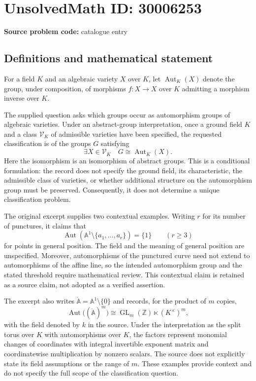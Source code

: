 \documentclass[11pt]{article}
\newcommand{\Z}{\mathbb{Z}}
\begin{document}
\section*{UnsolvedMath ID: 30006253}
\textbf{Source problem code:} catalogue entry
\subsection{Definitions and mathematical statement}
For a field \(K\) and an algebraic variety \(X\) over \(K\), let \(\operatorname{Aut}_K(X)\) denote the group, under composition, of morphisms \(f:X\to X\) over \(K\) admitting a morphism inverse over \(K\).

The supplied question asks which groups occur as automorphism groups of algebraic varieties. Under an abstract-group interpretation, once a ground field \(K\) and a class \(\mathcal V_K\) of admissible varieties have been specified, the requested classification is of the groups \(G\) satisfying
\[
\exists X\in\mathcal V_K\quad G\cong\operatorname{Aut}_K(X).
\]
Here the isomorphism is an isomorphism of abstract groups. This is a conditional formulation: the record does not specify the ground field, its characteristic, the admissible class of varieties, or whether additional structure on the automorphism group must be preserved. Consequently, it does not determine a unique classification problem.

The original excerpt supplies two contextual examples. Writing \(r\) for its number of punctures, it claims that
\[
\operatorname{Aut}\!\left(\mathbb A^1\setminus\{a_1,\ldots,a_r\}\right)=\{1\}
\qquad(r\geq3)
\]
for points in general position. The field and the meaning of general position are unspecified. Moreover, automorphisms of the punctured curve need not extend to automorphisms of the affine line, so the intended automorphism group and the stated threshold require mathematical review. This contextual claim is retained as a source claim, not adopted as a verified assertion.

The excerpt also writes \(\dot{\mathbb A}=\mathbb A^1\setminus\{0\}\) and records, for the product of \(m\) copies,
\[
\operatorname{Aut}\bigl((\dot{\mathbb A})^m\bigr)
\cong \operatorname{GL}_m(\Z)\ltimes(K^\times)^m,
\]
with the field denoted by \(k\) in the source. Under the interpretation as the split torus over \(K\) with automorphisms over \(K\), the factors represent monomial changes of coordinates with integral invertible exponent matrix and coordinatewise multiplication by nonzero scalars. The source does not explicitly state its field assumptions or the range of \(m\). These examples provide context and do not specify the full scope of the classification question.
\end{document}
